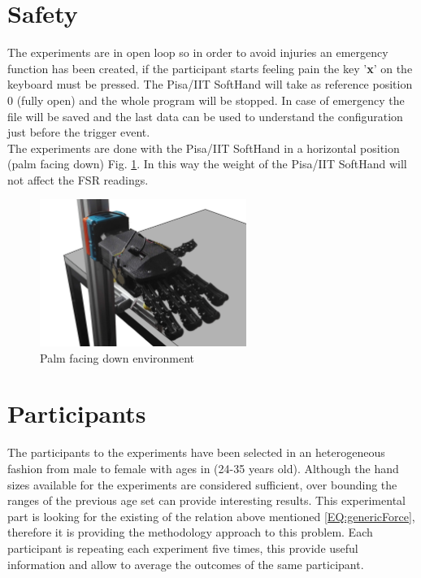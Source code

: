 \section{Safety}\label{sec:safety}
The experiments are in open loop so in order to avoid injuries an emergency function has been created, if the participant starts feeling pain the key '\textbf{x}' on the keyboard must be pressed. The Pisa/IIT SoftHand will take as reference position 0 (fully open) and the whole program will be stopped.
In case of emergency the file will be saved and the last data can be used to understand the configuration just before the trigger event.\\
The experiments are done with the Pisa/IIT SoftHand in a horizontal position (palm facing down) Fig. \ref{Fig:palmdown}. In this way the weight of the Pisa/IIT SoftHand will not affect the FSR readings. 

\begin{figure}[ht]
\centering
\includegraphics[width=0.6\textwidth]{Figure/stand.png}
\caption{Palm facing down environment}
\label{Fig:palmdown}
\end{figure}

\section*{Participants}\label{sec:participants}
The participants to the experiments have been selected in an heterogeneous fashion from male to female with ages in (24-35 years old). Although the hand sizes available for the experiments are considered sufficient, over bounding the ranges of the previous age set can provide interesting results.
This experimental part is looking for the existing of the relation above mentioned \ref{EQ:genericForce}, therefore it is providing the methodology approach to this problem.
Each participant is repeating each experiment five times, this provide useful information and allow to average the outcomes of the same participant.

